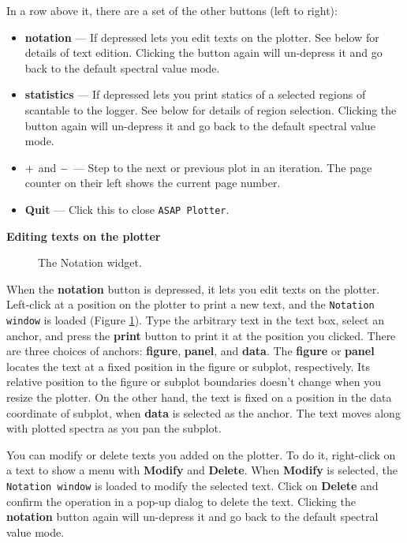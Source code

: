 In a row above it, there are a set of the other buttons (left to right):
\begin{itemize}
\item {\bf notation} --- If depressed lets you edit texts on the plotter. 
  See below for details of text edition.
  Clicking the button again will un-depress it and go back 
  to the default spectral value mode.
\item {\bf statistics} --- If depressed lets you print statics of a 
  selected regions of scantable to the logger.
  See below for details of region selection.
  Clicking the button again will un-depress it and go back 
  to the default spectral value mode.
\item $ {\bf +} $ and $ {\bf -} $ --- Step to the next or previous plot 
  in an iteration. The page counter on their left shows the current page
  number.
\item {\bf Quit} --- Click this to close {\tt ASAP Plotter}.
\end {itemize}

{\bf Editing texts on the plotter}\\
\begin{figure}[h!]
\begin{center}
\caption{\label{fig:notationwin} The Notation widget.}
\hrulefill
\end{center}
\end{figure}

When the {\bf notation} button is depressed, 
it lets you edit texts on the plotter. 
Left-click at a position on the plotter to print a new text,
and the {\tt Notation window} is loaded (Figure \ref{fig:notationwin}).
Type the arbitrary text in the text box, select an anchor, and press 
the {\bf print} button to print it at the position you clicked.
There are three choices of anchors: {\bf figure}, 
{\bf panel}, and {\bf data}. 
The {\bf figure} or {\bf panel} locates the text at a fixed position 
in the figure or subplot, respectively. Its relative position to 
the figure or subplot boundaries doesn't change when you resize the plotter.
On the other hand, the text is fixed on a position in the data coordinate 
of subplot, when {\bf data} is selected as the anchor. 
The text moves along with plotted spectra as you pan the subplot.

You can modify or delete texts you added on the plotter. 
To do it, right-click on a text to show a menu with 
{\bf Modify} and {\bf Delete}. 
When {\bf Modify} is selected, the {\tt Notation window} is loaded
to modify the selected text. 
Click on {\bf Delete} and confirm the operation in a pop-up dialog 
to delete the text.
Clicking the {\bf notation} button again will un-depress it and go back 
to the default spectral value mode.


